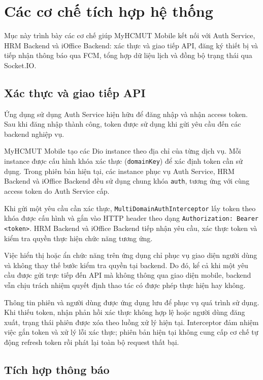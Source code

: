 \section{Các cơ chế tích hợp hệ thống}
\label{sec:tich_hop_he_thong}

Mục này trình bày các cơ chế giúp MyHCMUT Mobile kết nối với Auth Service, HRM Backend và iOffice Backend: xác thực và giao tiếp API, đăng ký thiết bị và tiếp nhận thông báo qua FCM, tổng hợp dữ liệu lịch và đồng bộ trạng thái qua Socket.IO.

\subsection{Xác thực và giao tiếp API}
\label{subsec:xac_thuc_da_he_thong}

Ứng dụng sử dụng Auth Service hiện hữu để đăng nhập và nhận access token. Sau khi đăng nhập thành công, token được sử dụng khi gửi yêu cầu đến các backend nghiệp vụ.

MyHCMUT Mobile tạo các Dio instance theo địa chỉ của từng dịch vụ. Mỗi instance được cấu hình khóa xác thực (\texttt{domainKey}) để xác định token cần sử dụng. Trong phiên bản hiện tại, các instance phục vụ Auth Service, HRM Backend và iOffice Backend đều sử dụng chung khóa \texttt{auth}, tương ứng với cùng access token do Auth Service cấp.

Khi gửi một yêu cầu cần xác thực, \texttt{MultiDomainAuthInterceptor} lấy token theo khóa được cấu hình và gắn vào HTTP header theo dạng \texttt{Authorization: Bearer <token>}. HRM Backend và iOffice Backend tiếp nhận yêu cầu, xác thực token và kiểm tra quyền thực hiện chức năng tương ứng.

Việc hiển thị hoặc ẩn chức năng trên ứng dụng chỉ phục vụ giao diện người dùng và không thay thế bước kiểm tra quyền tại backend. Do đó, kể cả khi một yêu cầu được gửi trực tiếp đến API mà không thông qua giao diện mobile, backend vẫn chịu trách nhiệm quyết định thao tác có được phép thực hiện hay không.

Thông tin phiên và người dùng được ứng dụng lưu để phục vụ quá trình sử dụng. Khi thiếu token, nhận phản hồi xác thực không hợp lệ hoặc người dùng đăng xuất, trạng thái phiên được xóa theo luồng xử lý hiện tại. Interceptor đảm nhiệm việc gắn token và xử lý lỗi xác thực; phiên bản hiện tại không cung cấp cơ chế tự động refresh token rồi phát lại toàn bộ request thất bại.

\subsection{Tích hợp thông báo}
\label{subsec:tich_hop_thong_bao}

